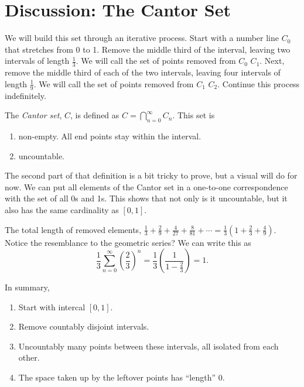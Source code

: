 \renewcommand{\theenumi}{\arabic{enumi}}
\renewcommand{\labelenumi}{\theenumi.}
\section{Discussion: The Cantor Set}

We will build this set through an iterative process. Start with a number line \(C_0\) that stretches from 0 to 1. Remove the middle third of the interval, leaving two intervals of length \(\frac{1}{3}\). We will call the set of points removed from \(C_0\) \(C_1\). Next, remove the middle third of each of the two intervals, leaving four intervals of length \(\frac{1}{9}\). We will call the set of points removed from \(C_1\) \(C_2\). Continue this process indefinitely. 


\begin{definition}
    The \textit{Cantor set}, \(C\), is defined as \(C = \bigcap_{n=0}^\infty C_n\). This set is 
    \begin{enumerate}
        \item non-empty. All end points stay within the interval.
        \item uncountable.
    \end{enumerate}
\end{definition}

The second part of that definition is a bit tricky to prove, but a visual will do for now. We can put all elements of the Cantor set in a one-to-one correspondence with the set of all 0s and 1s. This shows that not only is it uncountable, but it also has the same cardinality as \([0,1]\). %

The total length of removed elements, \(\frac{1}{3} + \frac{2}{9} + \frac{4}{27} + \frac{8}{81} + \cdots = \frac{1}{3}(1 + \frac{2}{3} + \frac{4}{9})\). Notice the resemblance to the geometric series? We can write this as \[\frac{1}{3} \sum_{n=0}^\infty \left(\frac{2}{3}\right)^n = \frac{1}{3} \left(\frac{1}{1 - \frac{2}{3}}\right) = 1.\] 

In summary, \begin{enumerate}
    \item Start with intercal \([0,1]\).
    \item Remove countably disjoint intervals.
    \item Uncountably many points between these intervals, all isolated from each other.
    \item The space taken up by the leftover points has ``length'' 0.
\end{enumerate}

